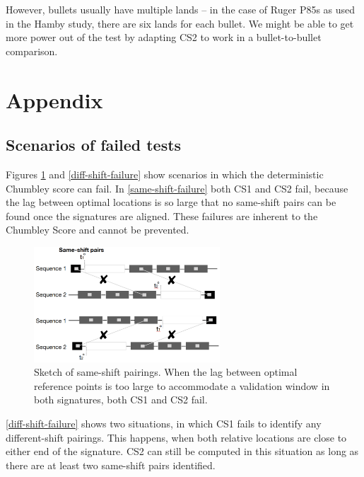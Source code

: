 \documentclass[12pt]{article}
\begin{document}
However, bullets usually have multiple lands -- in the case of Ruger
P85s as used in the Hamby study, there are six lands for each bullet. We
might be able to get more power out of the test by adapting CS2 to work
in a bullet-to-bullet comparison.

\hypertarget{appendix}{%
\section*{Appendix}\label{appendix}}

\begin{appendix}

\subsection{Scenarios of failed tests}
\label{appendix:appxfailed}
Figures \ref{same-shift-failure} and \ref{diff-shift-failure} show scenarios in which the deterministic Chumbley score can fail. 
In \autoref{same-shift-failure} both CS1 and CS2 fail, because the lag between optimal locations is so large that no same-shift pairs can be found once the signatures are aligned. These failures are inherent to the Chumbley Score and cannot be prevented.
\begin{figure}[hbtp]
\centering
\includegraphics[width=0.62\textwidth]{images/same-shift-failure.png}

\caption{\label{same-shift-failure}Sketch of same-shift pairings. When the lag between optimal reference points is too large to accommodate a validation window in both signatures, both CS1 and CS2 fail.}
\end{figure}

\autoref{diff-shift-failure} shows two situations, in which CS1 fails to identify any different-shift pairings. This happens, when both relative locations are close to either end of the signature. CS2 can still be computed in this situation as long as there are at least two same-shift pairs identified. 


\end{appendix}
\end{document}
